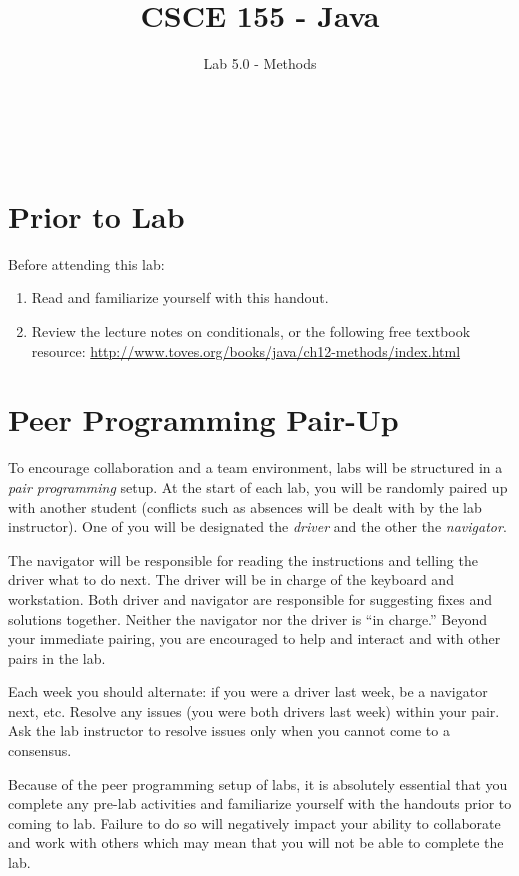 \documentclass[12pt]{scrartcl}
\title{CSCE 155 - Java}
\subtitle{Lab 5.0 - Methods}
\author{~}
\date{~}
\begin{document}
\maketitle

\section*{Prior to Lab}

Before attending this lab:
\begin{enumerate}
  \item Read and familiarize yourself with this handout.
  \item Review the lecture notes on conditionals, or the following free textbook resource: \url{http://www.toves.org/books/java/ch12-methods/index.html}
\end{enumerate}

\section*{Peer Programming Pair-Up}

To encourage collaboration and a team environment, labs will be
structured in a \emph{pair programming} setup.  At the start of
each lab, you will be randomly paired up with another student 
(conflicts such as absences will be dealt with by the lab instructor).
One of you will be designated the \emph{driver} and the other
the \emph{navigator}.  

The navigator will be responsible for reading the instructions and
telling the driver what to do next.  The driver will be in charge of the
keyboard and workstation.  Both driver and navigator are responsible
for suggesting fixes and solutions together.  Neither the navigator
nor the driver is ``in charge.''  Beyond your immediate pairing, you
are encouraged to help and interact and with other pairs in the lab.

Each week you should alternate: if you were a driver last week, 
be a navigator next, etc.  Resolve any issues (you were both drivers
last week) within your pair.  Ask the lab instructor to resolve issues
only when you cannot come to a consensus.  

Because of the peer programming setup of labs, it is absolutely 
essential that you complete any pre-lab activities and familiarize
yourself with the handouts prior to coming to lab.  Failure to do
so will negatively impact your ability to collaborate and work with 
others which may mean that you will not be able to complete the
lab.  
\end{document}
